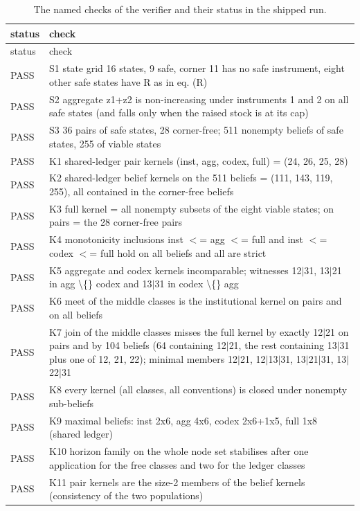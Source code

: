 \begin{longtable}{lp{}}
\caption{The named checks of the verifier and their status in the shipped run.}\label{tab:checks}\\
\toprule
status & check \\
\midrule
\endfirsthead
\toprule
status & check \\
\midrule
\endhead
\bottomrule
\endfoot
PASS & S1 state grid 16 states, 9 safe, corner 11 has no safe instrument, eight other safe states have R as in eq. (R) \\
PASS & S2 aggregate z1+z2 is non-increasing under instruments 1 and 2 on all safe states (and falls only when the raised stock is at its cap) \\
PASS & S3 36 pairs of safe states, 28 corner-free; 511 nonempty beliefs of safe states, 255 of viable states \\
PASS & K1 shared-ledger pair kernels (inst, agg, codex, full) = (24, 26, 25, 28) \\
PASS & K2 shared-ledger belief kernels on the 511 beliefs = (111, 143, 119, 255), all contained in the corner-free beliefs \\
PASS & K3 full kernel = all nonempty subsets of the eight viable states; on pairs = the 28 corner-free pairs \\
PASS & K4 monotonicity inclusions inst $<$= agg $<$= full and inst $<$= codex $<$= full hold on all beliefs and all are strict \\
PASS & K5 aggregate and codex kernels incomparable; witnesses 12$|$31, 13$|$21 in agg \textbackslash\{\} codex and 13$|$31 in codex \textbackslash\{\} agg \\
PASS & K6 meet of the middle classes is the institutional kernel on pairs and on all beliefs \\
PASS & K7 join of the middle classes misses the full kernel by exactly 12$|$21 on pairs and by 104 beliefs (64 containing 12$|$21, the rest containing 13$|$31 plus one of 12, 21, 22); minimal members 12$|$21, 12$|$13$|$31, 13$|$21$|$31, 13$|$22$|$31 \\
PASS & K8 every kernel (all classes, all conventions) is closed under nonempty sub-beliefs \\
PASS & K9 maximal beliefs: inst 2x6, agg 4x6, codex 2x6+1x5, full 1x8 (shared ledger) \\
PASS & K10 horizon family on the whole node set stabilises after one application for the free classes and two for the ledger classes \\
PASS & K11 pair kernels are the size-2 members of the belief kernels (consistency of the two populations) \\

\end{longtable}
